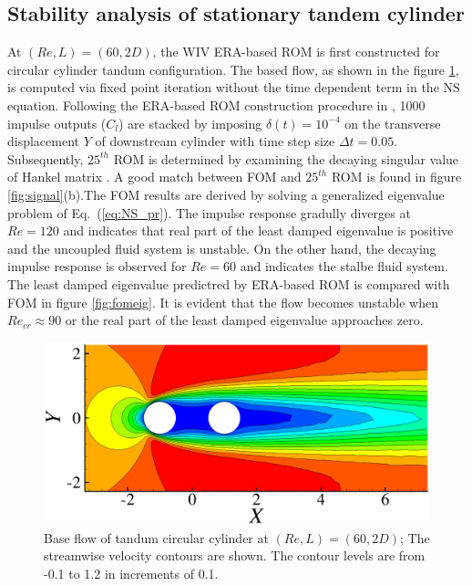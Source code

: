 \subsection{Stability analysis of stationary tandem cylinder}\label{sec:lsa}

At $(Re,L)=(60,2D)$, the WIV ERA-based ROM is first constructed for circular cylinder 
tandum configuration. The based flow, as shown in the figure \ref{fig:baseflow}, is computed via fixed point iteration without the 
time dependent term in the NS equation. 
Following the ERA-based ROM construction procedure in \cite{yao_jfm_1}, 
1000 impulse outputs ($C_l$) are stacked by imposing $\delta (t) = 10^{-4}$
on the transverse displacement $Y$ of downstream cylinder with time step size $\Delta t = 0.05$.
Subsequently, $25^{th}$ ROM is determined by examining the decaying singular value of Hankel matrix \cite{Juang1985}. 
A good match between FOM and $25^{th}$ ROM is found in figure \ref{fig:signal}(b).The FOM results 
are derived by solving a generalized eigenvalue problem of Eq.~(\ref{eq:NS_pr}).
The impulse response gradully diverges at $Re=120$
and indicates that real part of the least damped eigenvalue is positive and the uncoupled fluid system is unstable. 
On the other hand, the decaying impulse response is observed for $Re=60$ and indicates the stalbe fluid system. 
%
The least damped eigenvalue predictred by ERA-based ROM is compared with FOM in figure \ref{fig:fomeig}. 
It is evident that the flow becomes unstable 
when $Re_{cr} \approx 90$ or the real part of the least damped eigenvalue approaches zero. 


\begin{figure}
	 \centering
	 \includegraphics[scale=0.5]{baseflow_re60_ld2}
     \caption{Base flow of tandum circular cylinder at $(Re,L)=(60,2D)$; The 
     streamwise velocity contours are shown. The contour levels are from -0.1 to 1.2 
     in increments of 0.1.}
\label{fig:baseflow}
\end{figure}


